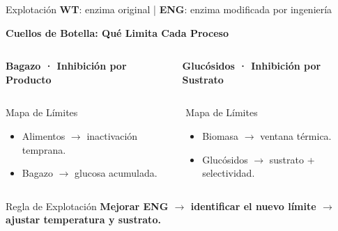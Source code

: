 \begin{frame}[label=explotacion]{Explotación \hfill{\tiny\color{TextoSuave}\textbf{WT}: enzima original \quad | \quad \textbf{ENG}: enzima modificada por ingeniería}}



{\color{Cian}\bfseries Cuellos de Botella: Qué Limita Cada Proceso}\par
\vspace{0.06cm}

\begin{columns}[T,onlytextwidth]
{\scriptsize\bfseries\color{Texto}Bagazo · Inhibición por Producto}\par\vspace{0.04cm}

{\scriptsize\bfseries\color{Texto}Glucósidos · Inhibición por Sustrato}\par\vspace{0.04cm}
\end{columns}

\vspace{0.05cm}
\begin{columns}[T,onlytextwidth]
\begin{block}{Mapa de Límites}
\scriptsize
\begin{itemize}
\item Alimentos $\rightarrow$ inactivación temprana.
\item Bagazo $\rightarrow$ glucosa acumulada.
\end{itemize}
\end{block}
\begin{block}{Mapa de Límites}
\scriptsize
\begin{itemize}
\item Biomasa $\rightarrow$ ventana térmica.
\item Glucósidos $\rightarrow$ sustrato + selectividad.
\end{itemize}
\end{block}
\end{columns}

\vspace{0.02cm}
\begin{alertblock}{Regla de Explotación}
\centering\small\bfseries
Mejorar ENG $\rightarrow$ identificar el nuevo límite $\rightarrow$ ajustar temperatura y sustrato.
\end{alertblock}
\end{frame}
